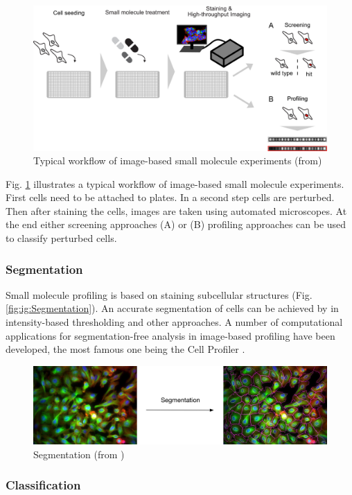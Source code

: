 \begin{figure}[H]
	\centering
	\includegraphics[width=0.8\linewidth]{bilder/cells/hcu.png}
	\caption{Typical workflow of image-based small molecule experiments (from\cite{Scheeder2018})}
	\label{fig:Workflow}
\end{figure}

Fig. \ref{fig:Workflow} illustrates a typical workflow of image-based small molecule experiments. First cells need to be attached to plates. In a second step cells are perturbed. Then after staining the cells, images are taken using automated microscopes. At the end either screening approaches (A) or (B) profiling approaches can be used to classify perturbed cells.

\subsubsection{Segmentation}

Small molecule profiling is based on staining subcellular structures (Fig. \ref{fig:ig:Segmentation}).
An accurate segmentation of cells can be achieved by in intensity-based thresholding and other approaches. A number of computational applications for segmentation-free analysis in image-based profiling have been developed, the most famous one being the Cell Profiler \cite{CellProfiler}.


\begin{figure}[H]
	\centering
	\includegraphics[width=0.8\linewidth]{bilder/cells/segmentation.png}
	\caption{Segmentation (from \cite{Pau})}
	\label{fig:Segmentation}
\end{figure}


\subsubsection{Classification}


